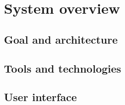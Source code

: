\chapter{System overview}
\label{chap:system}

\section{Goal and architecture}
\section{Tools and technologies}
\section{User interface}